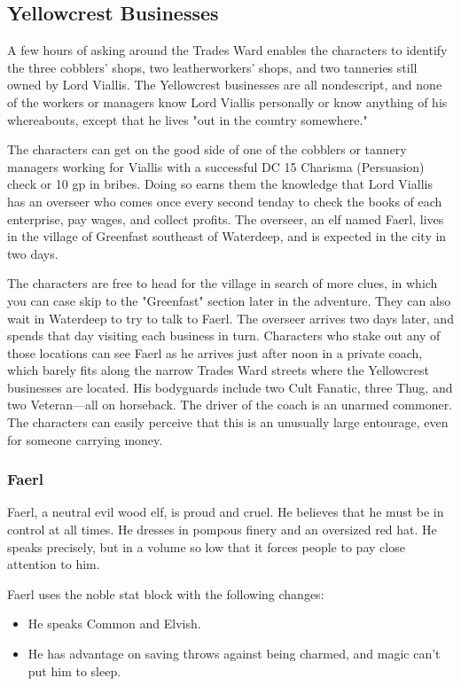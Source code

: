 \documentclass[10pt,a4paper,twoside,bg=print,twocolumn,openany,nodeprecatedcode]{dndbook}
\begin{document}
\subsection{Yellowcrest Businesses}
A few hours of asking around the Trades Ward enables the characters to identify the three cobblers' shops, two leatherworkers' shops, and two tanneries still owned by Lord Viallis. The Yellowcrest businesses are all nondescript, and none of the workers or managers know Lord Viallis personally or know anything of his whereabouts, except that he lives "out in the country somewhere."

The characters can get on the good side of one of the cobblers or tannery managers working for Viallis with a successful DC 15 Charisma (Persuasion) check or 10 gp in bribes. Doing so earns them the knowledge that Lord Viallis has an overseer who comes once every second tenday to check the books of each enterprise, pay wages, and collect profits. The overseer, an elf named Faerl, lives in the village of Greenfast southeast of Waterdeep, and is expected in the city in two days.

The characters are free to head for the village in search of more clues, in which you can case skip to the "Greenfast" section later in the adventure. They can also wait in Waterdeep to try to talk to Faerl. The overseer arrives two days later, and spends that day visiting each business in turn. Characters who stake out any of those locations can see Faerl as he arrives just after noon in a private coach, which barely fits along the narrow Trades Ward streets where the Yellowcrest businesses are located. His bodyguards include two Cult Fanatic, three Thug, and two Veteran—all on horseback. The driver of the coach is an unarmed commoner. The characters can easily perceive that this is an unusually large entourage, even for someone carrying money.

\subsubsection{Faerl}
Faerl, a neutral evil wood elf, is proud and cruel. He believes that he must be in control at all times. He dresses in pompous finery and an oversized red hat. He speaks precisely, but in a volume so low that it forces people to pay close attention to him.

Faerl uses the noble stat block with the following changes:


\begin{itemize}
\item He speaks Common and Elvish.
\item He has advantage on saving throws against being charmed, and magic can't put him to sleep.
\end{itemize}
\end{document}
